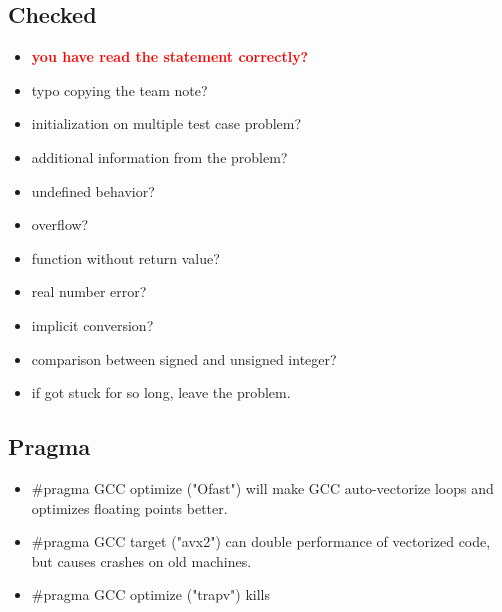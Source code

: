 \documentclass[portrait, 8pt, a4paper, oneside]{extarticle}
\begin{document}
\begin{multicols}{3}
\begin{itemize}
\end{itemize}

\subsection{Checked}
\begin{itemize}
    \item \textcolor{red}{\textbf{you have read the statement correctly?}}
    \item typo copying the team note?
    \item initialization on multiple test case problem?
    \item additional information from the problem?
    \item undefined behavior?
    \item overflow?
    \item function without return value?
    \item real number error?
    \item implicit conversion?
    \item comparison between signed and unsigned integer?
    \item if got stuck for so long, leave the problem.
\end{itemize}

\subsection{Pragma}
\begin{itemize}
\item \#pragma GCC optimize ("Ofast") will make GCC
auto-vectorize loops and optimizes floating points better.

\item \#pragma GCC target ("avx2") can double performance of
vectorized code, but causes crashes on old machines.

\item \#pragma GCC optimize ("trapv") kills 
\end{itemize}



\end{multicols}
\end{document}
